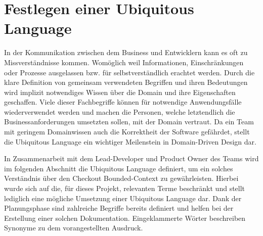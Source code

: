 \section{Festlegen einer Ubiquitous Language}

In der Kommunikation zwischen dem Business und Entwicklern kann es oft zu Missverständnisse kommen. Womöglich weil Informationen, Einschränkungen oder Prozesse ausgelassen bzw. für selbstverständlich erachtet werden. Durch die klare Definition von gemeinsam verwendeten Begriffen und ihren Bedeutungen wird implizit notwendiges Wissen über die Domain und ihre Eigenschaften geschaffen. Viele dieser Fachbegriffe können für notwendige Anwendungsfälle wiederverwendet werden und machen die Personen, welche letztendlich die Businessanforderungen umsetzten sollen, mit der Domain vertraut. Da ein Team mit geringem Domainwissen auch die Korrektheit der Software gefährdet, stellt die Ubiquitous Language ein wichtiger Meilenstein in Domain-Driven Design dar.

In Zusammenarbeit mit dem Lead-Developer und \Gls{Product Owner} des Teams wird im folgenden Abschnitt die Ubiquitous Language definiert, um ein solches Verständnis über den Checkout Bounded-Context zu gewährleisten. Hierbei wurde sich auf die, für dieses Projekt, relevanten Terme beschränkt und stellt lediglich eine mögliche Umsetzung einer Ubiquitous Language dar. Dank der Planungsphase sind zahlreiche Begriffe bereits definiert und helfen bei der Erstellung einer solchen Dokumentation. Eingeklammerte Wörter beschreiben Synonyme zu dem vorangestellten Ausdruck.

